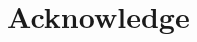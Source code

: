 \documentclass[main.tex]{subfiles}
\begin{document}
\section*{Acknowledge}

\lipsum[1]
\end{document}
